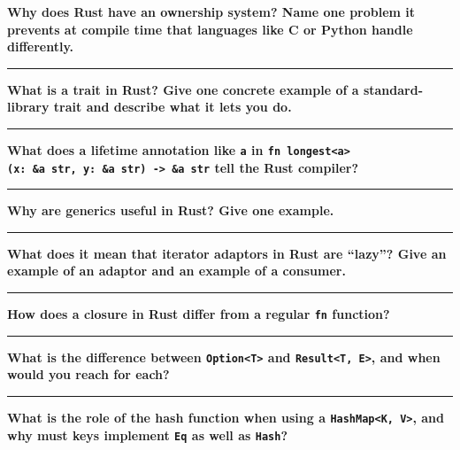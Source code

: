 \documentclass[
  11pt,
]{article}
\begin{document}
\textbf{Why does Rust have an ownership system? Name one problem it
prevents at compile time that languages like C or Python handle
differently.}

\begin{center}\rule{0.5\linewidth}{0.5pt}\end{center}

\textbf{What is a trait in Rust? Give one concrete example of a
standard-library trait and describe what it lets you do.}

\begin{center}\rule{0.5\linewidth}{0.5pt}\end{center}

\textbf{What does a lifetime annotation like
\texttt{\textquotesingle{}a} in
\texttt{fn\ longest\textless{}\textquotesingle{}a\textgreater{}(x:\ \&\textquotesingle{}a\ str,\ y:\ \&\textquotesingle{}a\ str)\ -\textgreater{}\ \&\textquotesingle{}a\ str}
tell the Rust compiler?}

\begin{center}\rule{0.5\linewidth}{0.5pt}\end{center}

\textbf{Why are generics useful in Rust? Give one example.}

\begin{center}\rule{0.5\linewidth}{0.5pt}\end{center}

\textbf{What does it mean that iterator adaptors in Rust are ``lazy''?
Give an example of an adaptor and an example of a consumer.}

\begin{center}\rule{0.5\linewidth}{0.5pt}\end{center}

\textbf{How does a closure in Rust differ from a regular \texttt{fn}
function?}

\begin{center}\rule{0.5\linewidth}{0.5pt}\end{center}

\textbf{What is the difference between
\texttt{Option\textless{}T\textgreater{}} and
\texttt{Result\textless{}T,\ E\textgreater{}}, and when would you reach
for each?}

\begin{center}\rule{0.5\linewidth}{0.5pt}\end{center}

\textbf{What is the role of the hash function when using a
\texttt{HashMap\textless{}K,\ V\textgreater{}}, and why must keys
implement \texttt{Eq} as well as \texttt{Hash}?}
\end{document}
